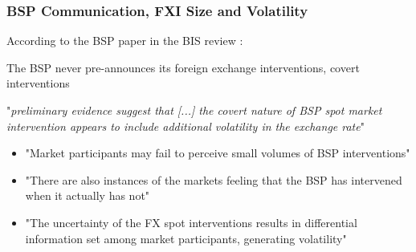 \documentclass{beamer}
\newenvironment{wideitemize}{\itemize\addtolength{\itemsep}{10pt}}{\enditemize}
\begin{document}
\begin{frame}
  \frametitle{BSP Communication, FXI Size and Volatility}
  According to the BSP paper in the BIS review \href{https://www.bis.org/publ/bppdf/bispap73s.pdf}{}:
  \begin{wideitemize}
  \item The BSP never pre-announces its foreign exchange interventions, covert interventions
  \item "\emph{preliminary evidence suggest that [...] the covert nature of BSP spot market intervention appears to include additional volatility in the exchange rate}"
    \begin{itemize}
    \item "Market participants may fail to perceive small volumes of BSP interventions"
    \item "There are also instances of the markets feeling that the BSP has intervened when it actually has not"
    \item "The uncertainty of the FX spot interventions results in differential information set among market participants, generating volatility"
    \end{itemize}    
  \end{wideitemize}  
\end{frame}







\end{document}
